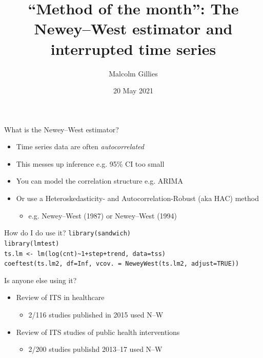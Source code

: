 \documentclass[aspectratio=169,12pt]{beamer} %
\title{``Method of the month'': The Newey--West estimator and interrupted time series}
\author{Malcolm Gillies}
\date{20 May 2021}
\begin{document}
{
\begin{frame}
\titlepage
\end{frame}
}

\begin{frame}{What is the Newey--West estimator?}
	\begin{itemize}
		\item Time series data are often \emph{autocorrelated}
		\item This messes up inference e.g. 95\% CI too small
		\item You can model the correlation structure e.g. ARIMA
		\item Or use a Heteroskedasticity- and Autocorrelation-Robust (aka HAC) method
		\begin{itemize}
			\item e.g. Newey--West (1987) or Newey--West (1994)
		\end{itemize}
	\end{itemize}
\end{frame}

\begin{frame}{How do I do use it?}
\texttt{library(sandwich)} \\
\texttt{library(lmtest)} \\
\medskip
\texttt{ts.lm <- lm(log(cnt)\textasciitilde 1+step+trend, data=tss)} \\
\texttt{coeftest(ts.lm2, df=Inf, vcov. = NeweyWest(ts.lm2, adjust=TRUE))}
\end{frame}

\begin{frame}{Is anyone else using it?}
	\begin{itemize}
		\item Review of ITS in healthcare
		\citep{hudson_methodology_2019}
		\begin{itemize}
			\item 2/116 studies published in 2015 used N--W
		\end{itemize}
		\item Review of ITS studies of public health interventions
		\citep{turner_design_2020}
		\begin{itemize}
			\item 2/200 studies publishd 2013--17 used N--W
		\end{itemize}
	\end{itemize}
\end{frame}
\end{document}
